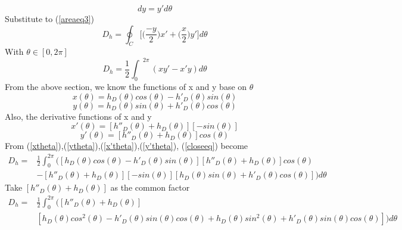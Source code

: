 \documentclass[a4paper]{article}
\begin{document}
\begin{equation*}
    dy = y'd\theta
\end{equation*}
Substitute to (\ref{areaeq3})
\begin{equation*}
    D_h = \oint_C \bigg[\bigg(\frac{-y}{2}\bigg)x' + \bigg(\frac{x}{2}\bigg)y'\bigg]d\theta
\end{equation*}
With $\theta \in \left[0,2\pi\right] $
\begin{equation}\label{closeeq}
    D_h = \frac{1}{2} {\int_0}^{2\pi} (xy' - x'y) d\theta
\end{equation}
From the above section, we know the functions of x and y base on $\theta$
\begin{equation}\label{xtheta}
    x(\theta) = h_D(\theta)cos(\theta) - h'_D(\theta)sin(\theta)
\end{equation}
\begin{equation}\label{ytheta}
    y(\theta) = h_D(\theta)sin(\theta) + h'_D(\theta)cos(\theta)
\end{equation}
Also, the derivative functions of x and y
\begin{equation}\label{x'theta}
    x'(\theta) = \left[ h''_D(\theta) + h_D(\theta)\right]\left[-sin(\theta)\right] 
\end{equation}
\begin{equation}\label{y'theta}
    y'(\theta) = \left[ h''_D(\theta) + h_D(\theta)\right]cos(\theta) 
\end{equation}
From (\ref{xtheta}),(\ref{ytheta}),(\ref{x'theta}),(\ref{y'theta}), (\ref{closeeq}) become
\begin{equation*}
    \begin{aligned}
    D_h ={} & \frac{1}{2} \int_0^{2\pi} \big(\left[h_D(\theta)cos(\theta) - h'_D(\theta)sin(\theta)\right]\left[ h''_D(\theta) + h_D(\theta)\right]cos(\theta) \\
          & - \left[ h''_D(\theta) + h_D(\theta)\right]\left[-sin(\theta)\right] \left[h_D(\theta)sin(\theta) + h'_D(\theta)cos(\theta)\right]\big)  d\theta
    \end{aligned}
\end{equation*}
Take $\left[ h''_D(\theta) + h_D(\theta)\right]$ as the common factor
\begin{equation*}
    \begin{aligned}
    D_h ={} & \frac{1}{2} \int_0^{2\pi} \big(\left[ h''_D(\theta) + h_D(\theta)\right]\\ 
            & \left[h_D(\theta)cos^2(\theta) - h'_D(\theta)sin(\theta)cos(\theta) + h_D(\theta)sin^2(\theta) + h'_D(\theta)sin(\theta)cos(\theta)\right]\big)d\theta
    \end{aligned}
\end{equation*}
\end{document}
